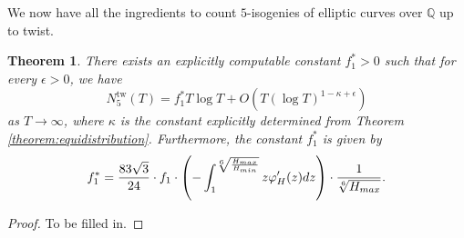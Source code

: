 \documentclass[12pt]{amsart}
\newcounter{counter}[section] %
\numberwithin{equation}{section} %
\newtheorem{theorem}[counter]{Theorem}
\theoremstyle{definition} \newtheorem{definition}[counter]{Definition}
\theoremstyle{remark} \newtheorem{nonexam}[counter]{Non-example}
\let\originalleft\left \let\originalright\right
\renewcommand{\left}{\mathopen{}\mathclose\bgroup\originalleft}
\renewcommand{\right}{\aftergroup\egroup\originalright}
\DeclareMathOperator{\tw}{tw} %
\begin{document}
We now have all the ingredients to count $5$-isogenies of elliptic curves over $\mathbb{Q}$ up to twist.

\begin{theorem}
    There exists an explicitly computable constant $f_{1}^* > 0$ such that for every $\epsilon > 0$, we have
    \begin{equation*}
        N_5^{\tw}(T) = f_1^* T \log T + O(T(\log T)^{1-\kappa + \epsilon})
    \end{equation*}
    as $T \to \infty$, where $\kappa$ is the constant explicitly determined from Theorem \ref{theorem:equidistribution}. Furthermore, the constant $f_1^*$ is given by
    \begin{equation*}
        f_1^* = \frac{83\sqrt{3}}{24} \cdot f_1 \cdot \left(- \int_1^{\sqrt[6]{\frac{H_{max}}{H_{min}}}} z \varphi'_H(z) dz \right) \cdot \frac{1}{\sqrt[6]{H_{max}}}.
    \end{equation*}
\end{theorem}
\begin{proof}
    To be filled in.
\end{proof}


\clearpage
{} 
\end{document}
